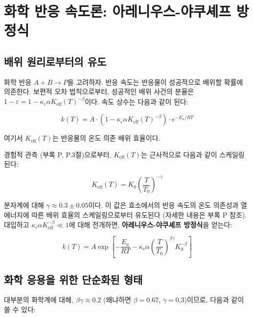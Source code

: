 \documentclass[12pt,a4paper]{article}
\newcommand{\Keff}{K_{\mathrm{eff}}}
\newcommand{\kappac}{\kappa_c}
\newcommand{\eps}{\varepsilon}
\begin{document}
	\section{화학 반응 속도론: 아레니우스-야쿠셰프 방정식}
	\label{sec:kinetics}
	
	\subsection{배위 원리로부터의 유도}
	
	화학 반응 $A + B \rightarrow P$을 고려하자. 반응 속도는 반응물이 성공적으로 배위할 확률에 의존한다. 보편적 오차 법칙으로부터, 성공적인 배위 사건의 분율은 $1 - \eps = 1 - \kappac \alpha \Keff(T)^{-\beta}$이다. 속도 상수는 다음과 같이 된다:
	
	\begin{equation}
		k(T) = A \cdot (1 - \kappac \alpha \Keff(T)^{-\beta}) \cdot e^{-E_a/RT}
		\label{eq:arrhenius-base}
	\end{equation}
	
	여기서 $\Keff(T)$는 반응물의 온도 의존 배위 효율이다.
	
	경험적 관측 (부록 P, P.3절)으로부터, $\Keff(T)$는 근사적으로 다음과 같이 스케일링된다:
	
	\begin{equation}
		\Keff(T) = K_0 \left(\frac{T}{T_0}\right)^{-\gamma}
		\label{eq:K-T-scaling}
	\end{equation}
	
	분자계에 대해 $\gamma \approx 0.3 \pm 0.05$이다. 이 값은 효소에서의 반응 속도의 온도 의존성과 열에너지에 따른 배위 효율의 스케일링으로부터 유도된다 (자세한 내용은 부록 P 참조). 대입하고 $\kappac \alpha \Keff^{-\beta} \ll 1$에 대해 전개하면, \textbf{아레니우스-야쿠셰프 방정식}을 얻는다:
	
	\begin{equation}
		\boxed{k(T) = A \exp\left[-\frac{E_a}{RT} - \kappac \alpha \left(\frac{T}{T_0}\right)^{\beta\gamma} K_0^{-\beta}\right]}
		\label{eq:arrhenius-yakushev}
	\end{equation}
	
	\subsection{화학 응용을 위한 단순화된 형태}
	
	대부분의 화학계에 대해, $\beta\gamma \approx 0.2$ (왜냐하면 $\beta = 0.67$, $\gamma = 0.3$)이므로, 다음과 같이 쓸 수 있다:
	
\end{document}
